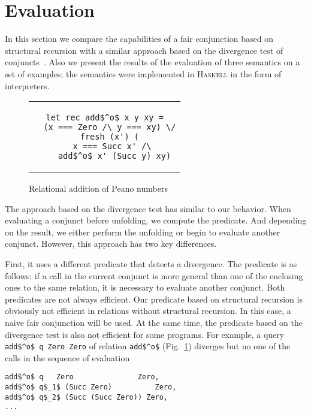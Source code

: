 \section{Evaluation}
\label{sec:eval}

In this section we compare the capabilities of a fair conjunction based on structural recursion with a similar approach based on the divergence test of conjuncts~\cite{fair:DivTest}. Also we present the results of the evaluation of three semantics on a set of examples; the semantics were implemented in \textsc{Haskell} in the form of interpreters.

\begin{figure}[h!]
\centering
\begin{tabular}{c}
\begin{lstlisting}
let rec add$^o$ x y xy =
  (x === Zero /\ y === xy) \/
  fresh (x') (
    x === Succ x' /\ 
    add$^o$ x' (Succ y) xy)
\end{lstlisting}
\end{tabular}
\caption{Relational addition of Peano numbers}
\label{fair:lst-addo}
\end{figure}

The approach based on the divergence test has similar to our behavior. When evaluating a conjunct before unfolding, we compute the predicate. And depending on the result, we either perform
the unfolding or begin to evaluate another conjunct. However, this approach has two key differences.

First, it uses a different predicate that detects a divergence. The predicate is as follows: if a call in the current conjunct is more general than one of the enclosing ones to the same relation, it
is necessary to evaluate another conjunct. Both predicates are not always efficient. Our predicate based on structural recursion is obviously not efficient in relations without structural recursion.
In this case, a naive fair conjunction will be used. At the same time, the predicate based on the divergence test is also not efficient for some programs. For example,
a query \lstinline{add$^o$ q Zero Zero} of relation \lstinline{add$^o$} (Fig.~\ref{fair:lst-addo}) diverges but no one of the calls in the sequence of evaluation

\begin{lstlisting}
add$^o$ q   Zero               Zero, 
add$^o$ q$_1$ (Succ Zero)          Zero, 
add$^o$ q$_2$ (Succ (Succ Zero)) Zero, 
...
\end{lstlisting}

